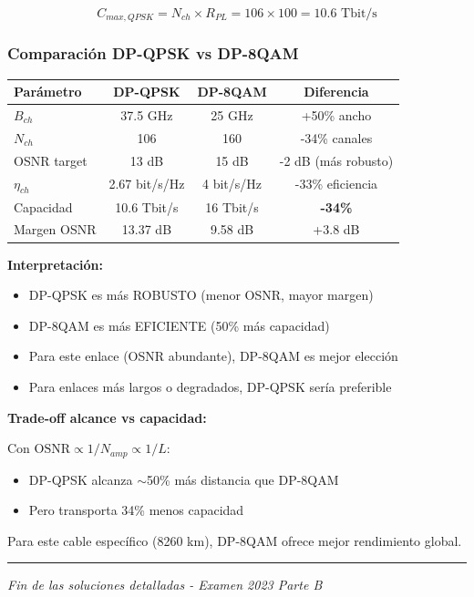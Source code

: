 \documentclass[a4paper,10pt]{article}
\begin{document}
$$C_{max,QPSK} = N_{ch} \times R_{PL} = 106 \times 100 = \boxed{10.6 \text{ Tbit/s}}$$

\subsubsection{Comparación DP-QPSK vs DP-8QAM}

\begin{center}
\begin{tabular}{lccc}
\toprule
\textbf{Parámetro} & \textbf{DP-QPSK} & \textbf{DP-8QAM} & \textbf{Diferencia} \\
\midrule
$B_{ch}$ & 37.5 GHz & 25 GHz & +50\% ancho \\
$N_{ch}$ & 106 & 160 & -34\% canales \\
OSNR target & 13 dB & 15 dB & -2 dB (más robusto) \\
$\eta_{ch}$ & 2.67 bit/s/Hz & 4 bit/s/Hz & -33\% eficiencia \\
Capacidad & 10.6 Tbit/s & 16 Tbit/s & \textbf{-34\%} \\
Margen OSNR & 13.37 dB & 9.58 dB & +3.8 dB \\
\bottomrule
\end{tabular}
\end{center}

\textbf{Interpretación:}
\begin{itemize}
    \item DP-QPSK es más ROBUSTO (menor OSNR, mayor margen)
    \item DP-8QAM es más EFICIENTE (50\% más capacidad)
    \item Para este enlace (OSNR abundante), DP-8QAM es mejor elección
    \item Para enlaces más largos o degradados, DP-QPSK sería preferible
\end{itemize}

\textbf{Trade-off alcance vs capacidad:}

Con $\text{OSNR} \propto 1/N_{amp} \propto 1/L$:
\begin{itemize}
    \item DP-QPSK alcanza $\sim$50\% más distancia que DP-8QAM
    \item Pero transporta 34\% menos capacidad
\end{itemize}

Para este cable específico (8260 km), DP-8QAM ofrece mejor rendimiento global.

\vspace{1cm}
\hrule
\begin{center}
\textit{Fin de las soluciones detalladas - Examen 2023 Parte B}
\end{center}
\end{document}
